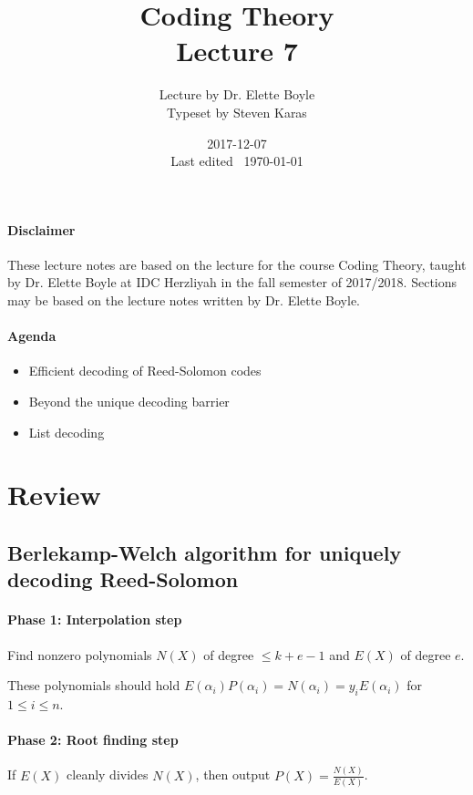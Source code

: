 \documentclass{idc_msc}
\title{Coding Theory\\\large Lecture 7}
\date{2017-12-07 \\ Last edited \currenttime\ \today}
\author{Lecture by Dr. Elette Boyle\\Typeset by Steven Karas}
\begin{document}
\maketitle

\paragraph{Disclaimer}

These lecture notes are based on the lecture for the course Coding Theory, taught by Dr. Elette Boyle at IDC Herzliyah in the fall semester of 2017/2018.
Sections may be based on the lecture notes written by Dr. Elette Boyle.

\paragraph{Agenda}

\begin{itemize}
  \item Efficient decoding of Reed-Solomon codes
  \item Beyond the unique decoding barrier
  \item List decoding
\end{itemize}

\section{Review}

\subsection{Berlekamp-Welch algorithm for uniquely decoding Reed-Solomon}

\paragraph{Phase 1: Interpolation step}

Find nonzero polynomials \(N(X)\) of degree \(\le k + e - 1\) and \(E(X)\) of degree \(e\).

These polynomials should hold \(E(\alpha_i)P(\alpha_i) = N(\alpha_i) = y_i E(\alpha_i)\) for \(1 \le i \le n\).

\paragraph{Phase 2: Root finding step}

If \(E(X)\) cleanly divides \(N(X)\), then output \(P(X) = \frac{N(X)}{E(X)}\).
\end{document}
